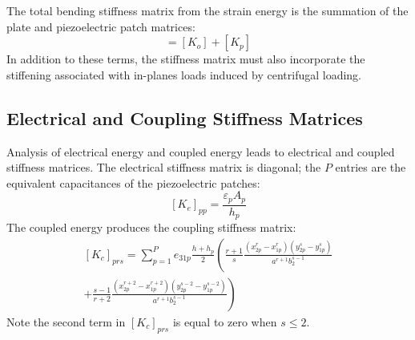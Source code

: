 \documentclass[thesis]{fputhesis}
\begin{document}
\begin{body}
The total bending stiffness matrix from the strain energy is the summation of the plate and piezoelectric patch matrices:
\begin{equation}
[K]=[K_o]+[K_p]
\end{equation}
In addition to these terms, the stiffness matrix must also incorporate the stiffening associated with in-planes loads induced by centrifugal loading. 



\subsection{Electrical and Coupling Stiffness Matrices}
Analysis of electrical energy and coupled energy leads to electrical and coupled stiffness matrices. The electrical stiffness matrix is diagonal; the $P$ entries are the equivalent capacitances of the piezoelectric patches:
\begin{equation}\label{ElectricalStiffness}
[K_e]_{pp}=\frac{\varepsilon_p A_p}{h_p}
\end{equation}
The coupled energy produces the coupling stiffness matrix:
\begin{equation}\label{CoupledStiffness}
\begin{split}
[K_c]_{prs}=\sum_{p=1}^P e_{31p} \frac{h+h_p}{2} \left(\frac{r+1}{s} \frac{(x_{2p}^r-x_{1p}^r)(y_{2p}^s-y_{1p}^s)}{a^{r+1}b_2^{s-1}}\right. \\
\left. +\frac{s-1}{r+2} \frac{(x_{2p}^{r+2}-x_{1p}^{r+2})(y_{2p}^{s-2}-y_{1p}^{s-2})}{a^{r+1}b_2^{s-1}}\right)
\end{split}
\end{equation}
Note the second term in $[K_c]_{prs}$ is equal to zero when $s \leq 2$.





\end{body}
\end{document}
